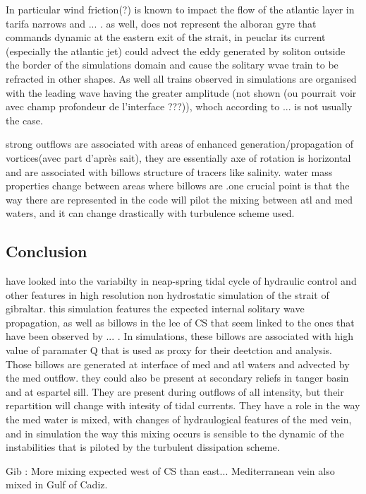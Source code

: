 In particular wind friction(?) is known to impact the flow of the atlantic layer in tarifa narrows and ... . as well, does not represent the alboran gyre that commands dynamic at the eastern exit of the strait, in peuclar its current (especially the atlantic jet) could advect the eddy generated by soliton outside the border of the simulations domain and cause the solitary wvae train to be refracted in other shapes. As well all trains observed in simulations are organised with the leading wave having the greater amplitude (not shown (ou pourrait voir avec champ profondeur de l'interface ???)), whoch according to ... is not usually the case.

strong outflows are associated  with areas of enhanced generation/propagation of vortices(avec part d'après sait), they are essentially axe of rotation is horizontal and are associated with billows structure of tracers like salinity. water mass properties change between areas where billows are .one crucial point is that the way there are represented in the code will pilot the mixing between atl and med waters, and it can change drastically with turbulence scheme used.


\subsection{Conclusion}

have looked into the variabilty in neap-spring tidal cycle of hydraulic control and other features in high resolution non hydrostatic simulation of the strait of gibraltar. this simulation features the expected internal solitary wave propagation, as well as billows in the lee of CS that seem linked to the ones that have been observed by ... . In simulations, these billows are associated with high value of paramater Q that is used as proxy for their deetction and analysis. Those billows are generated at interface of med and atl waters and advected by the med outflow.   they could also be present at secondary reliefs in tanger basin and at espartel sill. They are present during outflows of all intensity, but their repartition will change with intesity of tidal currents. They have a role in the way the med water is mixed, with changes of hydraulogical features of the med vein, and in simulation the way this mixing occurs is sensible to the dynamic of the instabilities that is piloted by the turbulent dissipation scheme.



Gib :
More mixing expected west of CS than east... Mediterranean vein also mixed in Gulf of Cadiz.

